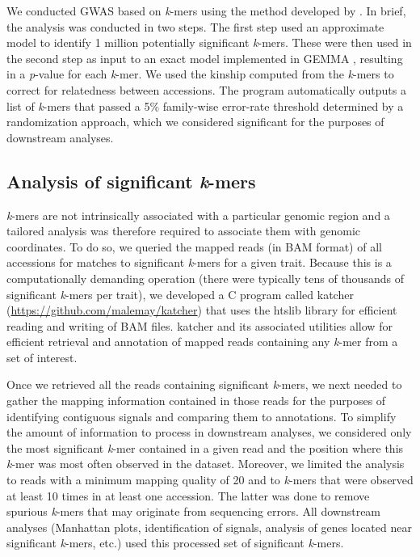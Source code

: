 We conducted GWAS based on \emph{k}-mers using the method developed by
\cite{voichek2020}. In brief, the
analysis was conducted in two steps. The first step used an approximate model
to identify 1 million potentially significant \emph{k}-mers. These were then used in
the second step as input to an exact model implemented in GEMMA \citep{zhou2012}, resulting
in a \emph{p}-value for each \emph{k}-mer. We
used the kinship computed from the \emph{k}-mers to correct for relatedness
between accessions. The program automatically outputs a list of \emph{k}-mers
that passed a 5\% family-wise error-rate threshold determined by a
randomization approach, which we considered significant for the purposes of
downstream analyses.

\subsection*{Analysis of significant \emph{k}-mers}
\label{sv-gwas-kmers-analysis-methods}

\emph{k}-mers are not intrinsically associated with a particular genomic region
and a tailored analysis was therefore required to associate them with genomic
coordinates. To do so, we queried the mapped reads (in BAM format) of all accessions for matches
to significant \emph{k}-mers for a given trait. Because this is a
computationally demanding operation (there were typically tens of thousands of
significant \emph{k}-mers per trait), we developed a C program called katcher
(\url{https://github.com/malemay/katcher}) that
uses the htslib library \citep{bonfield2021} for efficient reading and
writing of BAM files. katcher and its associated utilities allow for efficient
retrieval and annotation of mapped reads containing any \emph{k}-mer from a set
of interest.

Once we retrieved all the reads containing significant \emph{k}-mers, we next
needed to gather the mapping information contained in those reads for the
purposes of identifying contiguous signals and comparing them to annotations. To
simplify the amount of information to process in downstream analyses, we
considered only the most significant \emph{k}-mer contained in a given read and
the position where this \emph{k}-mer was most often observed in
the dataset. Moreover, we limited the analysis to reads with a minimum mapping
quality of 20 and to \emph{k}-mers that were observed at least 10 times in at
least one accession. The latter was done to remove spurious \emph{k}-mers that may originate
from sequencing errors. All downstream analyses (Manhattan plots,
identification of signals, analysis of genes located near significant
\emph{k}-mers, etc.) used this processed set of significant \emph{k}-mers.

